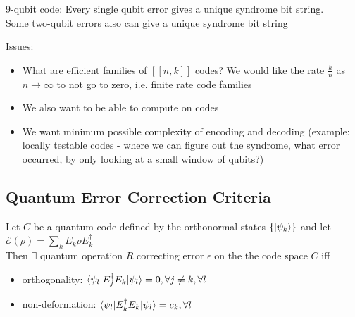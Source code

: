 \begin{fact}
    9-qubit code: Every single qubit error gives a unique syndrome bit string. \\
    Some two-qubit errors also can give a unique syndrome bit string
\end{fact}
Issues: 
\begin{itemize}
    \item What are efficient families of $[[n,k]]$ codes? We would like the rate $\frac{k}{n}$ as $n \rightarrow \infty$ to not go to zero, i.e. finite rate code families
    \item We also want to be able to compute on codes
    \item We want minimum possible complexity of encoding and decoding (example: locally testable codes - where we can figure out the syndrome, what error occurred, by only looking at a small window of qubits?)   
\end{itemize}



\subsection{Quantum Error Correction Criteria}
\begin{theorem}
    Let $C$ be a quantum code defined by the orthonormal states $\{\ket{\psi_k}\}$ and let $\mathcal{E}(\rho) = \sum_k E_k \rho E_k^\dagger$ \\
    Then $\exists$ quantum operation $R$ correcting error  $\epsilon$ on the the code space $C$ iff
    \begin{itemize}
        \item orthogonality: $\braket{\psi_l |E_j^\dagger E_k|\psi_l} = 0,  \forall j \neq k, \forall l$
        \item non-deformation: $\braket{\psi_l|E_k^\dagger E_k| \psi_l} = c_k, \forall l $
    \end{itemize}
\end{theorem}

